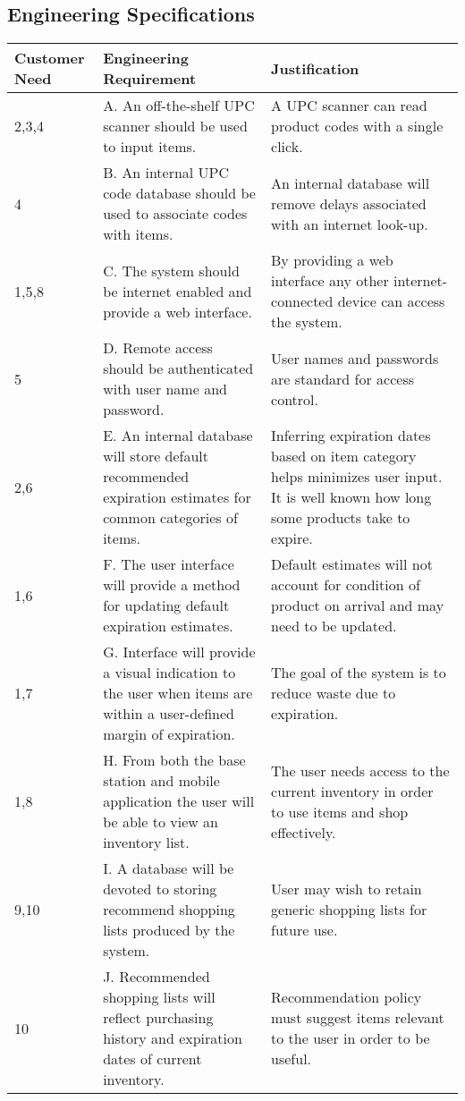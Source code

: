 \documentclass[11pt,letterpaper]{article}
\begin{document}
\subsection{Engineering Specifications}
\begin{table}[h!]
\begin{center}
\begin{tabular}{| p{1.2in} | p{2.5in} |p{2.5in} |}
\hline
Customer Need & Engineering Requirement & Justification \\
\hline
2,3,4 &A. An off-the-shelf UPC scanner should be used to input items. & A UPC scanner can read product codes with a single click.\\
\hline
4 &B. An internal UPC code database should be used to associate codes with items.&An internal database will remove delays associated with an internet look-up.\\
\hline
1,5,8&C. The system should be internet enabled and provide a web interface.&By providing a web interface any other internet-connected device can access the system.\\
\hline
5&D. Remote access should be authenticated with user name and password.&User names and passwords are standard for access control.\\
\hline
2,6&E. An internal database will store default recommended expiration estimates for common categories of items.&Inferring expiration dates based on item category helps minimizes user input. It is well known how long some products take to expire.\\
\hline
1,6&F. The user interface will provide a method for updating default expiration estimates.&Default estimates will not account for condition of product on arrival and may need to be updated.\\
\hline
1,7&G. Interface will provide a visual indication to the user when items are within a user-defined margin of expiration.&The goal of the system is to reduce waste due to expiration.\\
\hline
1,8&H. From both the base station and mobile application the user will be able to view an inventory list.&The user needs access to the current inventory in order to use items and shop effectively.\\
\hline
9,10&I. A database will be devoted to storing recommend shopping lists produced by the system.&User may wish to retain generic shopping lists for future use.\\
\hline
10&J. Recommended shopping lists will reflect purchasing history and expiration dates of current inventory.&Recommendation policy must suggest items relevant to the user in order to be useful.\\

\end{tabular}
\end{center}
\end{table}
\end{document}
